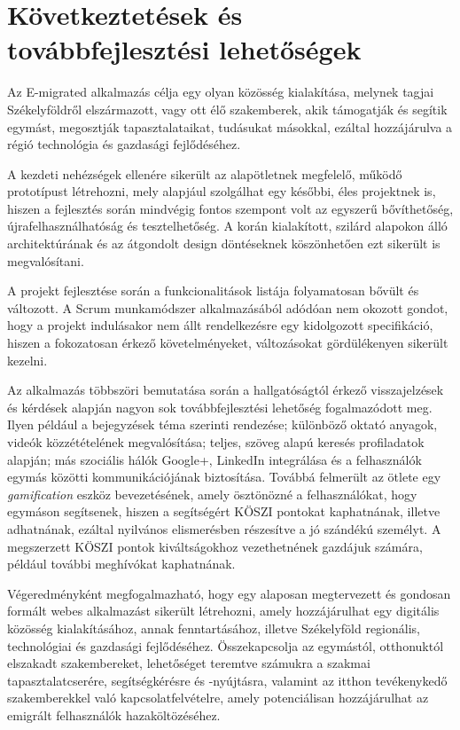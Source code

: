 \chapter{Következtetések és továbbfejlesztési lehetőségek}
\label{ch:kovetkeztetes}

Az E-migrated alkalmazás célja egy olyan közösség kialakítása, melynek tagjai Székelyföldről elszármazott, vagy ott élő szakemberek, akik támogatják és segítik egymást, megosztják tapasztalataikat, tudásukat másokkal, ezáltal hozzájárulva a régió technológia és gazdasági fejlődéséhez. 

A kezdeti nehézségek ellenére sikerült az alapötletnek megfelelő, működő prototípust létrehozni, mely alapjául szolgálhat egy későbbi, éles projektnek is, hiszen a fejlesztés során mindvégig fontos szempont volt az egyszerű bővíthetőség, újrafelhasználhatóság és tesztelhetőség.  A korán kialakított, szilárd alapokon álló architektúrának és az átgondolt design döntéseknek köszönhetően ezt sikerült is megvalósítani. 

A projekt fejlesztése során a funkcionalitások listája folyamatosan bővült és változott. A Scrum munkamódszer alkalmazásából adódóan nem okozott gondot, hogy a projekt indulásakor nem állt rendelkezésre egy kidolgozott specifikáció, hiszen a fokozatosan érkező követelményeket, változásokat gördülékenyen sikerült kezelni. 

Az alkalmazás többszöri bemutatása során a hallgatóságtól érkező visszajelzések és kérdések alapján nagyon sok továbbfejlesztési lehetőség fogalmazódott meg. Ilyen például a bejegyzések téma szerinti rendezése; különböző oktató anyagok, videók közzétételének megvalósítása; teljes, szöveg alapú keresés profiladatok alapján; más szociális hálók Google+, LinkedIn integrálása és a felhasználók egymás közötti kommunikációjának biztosítása. Továbbá felmerült az ötlete egy \textit{gamification} eszköz bevezetésének, amely ösztönözné a felhasználókat, hogy egymáson segítsenek, hiszen a segítségért KÖSZI pontokat kaphatnának, illetve adhatnának, ezáltal nyilvános elismerésben részesítve a jó szándékú személyt. A megszerzett KÖSZI pontok kiváltságokhoz vezethetnének gazdájuk számára, például további meghívókat kaphatnának. 

Végeredményként megfogalmazható, hogy egy alaposan megtervezett és gondosan formált webes alkalmazást sikerült létrehozni, amely hozzájárulhat egy digitális közösség kialakításához, annak fenntartásához, illetve Székelyföld regionális, technológiai és gazdasági fejlődéséhez. Összekapcsolja az egymástól, otthonuktól elszakadt szakembereket, lehetőséget teremtve számukra a szakmai tapasztalatcserére, segítségkérésre és -nyújtásra, valamint az itthon tevékenykedő szakemberekkel való kapcsolatfelvételre, amely potenciálisan hozzájárulhat az emigrált felhasználók hazaköltözéséhez. 
